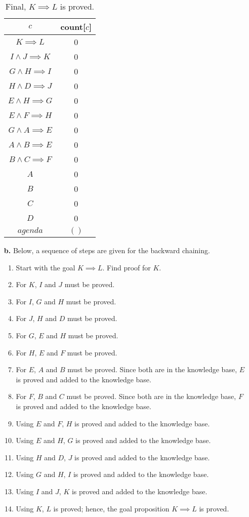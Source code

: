 \documentclass[12pt]{article}
\begin{document}
\begin{itemize}
\begin{table}[H]
\centering
\caption*{Final, $K \implies L$ is proved.}
\label{my-label1}
\begin{tabular}{ c c }
\hline
$c$ & count[$c$]\\ \hline
$K \implies L$ & 0\\
$I \land J \implies K$ & 0\\
$G \land H \implies I$ & 0\\
$H \land D \implies J$ & 0\\
$E \land H \implies G$ & 0\\
$E \land F \implies H$ & 0\\
$G \land A \implies E$ & 0\\
$A \land B \implies E$ & 0\\
$B \land C \implies F$ & 0\\
$A$ & 0\\
$B$ & 0\\
$C$ & 0\\
$D$ & 0\\ \hline
$agenda$ & $()$
\end{tabular}
\end{table}

\item[\textbf{b.}] Below, a sequence of steps are given for the backward chaining.
\begin{enumerate}
	\item Start with the goal $K \implies L$. Find proof for $K$.
	\item For $K$, $I$ and $J$ must be proved.
	\item For $I$, $G$ and $H$ must be proved.
	\item For $J$, $H$ and $D$ must be proved.
	\item For $G$, $E$ and $H$ must be proved.
	\item For $H$, $E$ and $F$ must be proved.
	\item For $E$, $A$ and $B$ must be proved. Since both are in the knowledge base, $E$ is proved and added to the knowledge base.
	\item For $F$, $B$ and $C$ must be proved. Since both are in the knowledge base, $F$ is proved and added to the knowledge base.
	\item Using $E$ and $F$, $H$ is proved and added to the knowledge base.
	\item Using $E$ and $H$, $G$ is proved and added to the knowledge base.
	\item Using $H$ and $D$, $J$ is proved and added to the knowledge base.
	\item Using $G$ and $H$, $I$ is proved and added to the knowledge base.
	\item Using $I$ and $J$, $K$ is proved and added to the knowledge base.
	\item Using $K$, $L$ is proved; hence, the goal proposition $K \implies L$ is proved.
\end{enumerate}


	\end{itemize}
\end{document}
